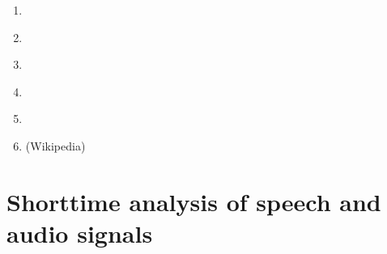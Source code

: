 \documentclass[letterpaper,10pt,english]{jupyterBook}
\begin{document}
\begin{enumerate}
\item {} 
\sphinxAtStartPar
{\hyperref[\detokenize{Representations/Fundamental_frequency_F0::doc}]{}}

\item {} 
\sphinxAtStartPar
{\hyperref[\detokenize{Representations/Zero-crossing_rate::doc}]{}}

\item {} 
\sphinxAtStartPar
{\hyperref[\detokenize{Representations/Deltas_and_Delta-deltas::doc}]{}}

\item {} 
\sphinxAtStartPar
{\hyperref[\detokenize{Representations/Pitch-Synchoronous_Overlap-Add_PSOLA::doc}]{}}

\item {} 
\sphinxAtStartPar
{\hyperref[\detokenize{Representations/Jitter_and_shimmer::doc}]{}}

\item {} 
\sphinxAtStartPar
{} (Wikipedia)

\end{enumerate}

\sphinxstepscope


\section{Short\sphinxhyphen{}time analysis of speech and audio signals}
\label{\detokenize{Representations/Short-time_analysis:short-time-analysis-of-speech-and-audio-signals}}\label{\detokenize{Representations/Short-time_analysis::doc}}
\end{document}
